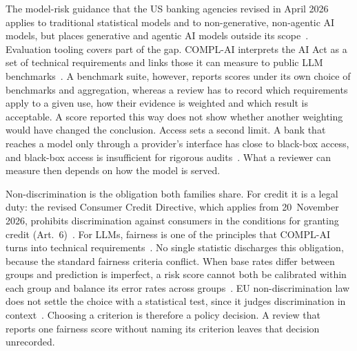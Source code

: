 The model-risk guidance that the US banking agencies revised in April 2026 applies to traditional statistical models and to non-generative, non-agentic AI models, but places generative and agentic AI models outside its scope~\cite{federalreserve2026sr262}.
Evaluation tooling covers part of the gap.
COMPL-AI interprets the AI Act as a set of technical requirements and links those it can measure to public LLM benchmarks~\cite{guldimann2024complai}.
A benchmark suite, however, reports scores under its own choice of benchmarks and aggregation, whereas a review has to record which requirements apply to a given use, how their evidence is weighted and which result is acceptable.
A score reported this way does not show whether another weighting would have changed the conclusion.
Access sets a second limit.
A bank that reaches a model only through a provider's interface has close to black-box access, and black-box access is insufficient for rigorous audits~\cite{casper2024blackbox}.
What a reviewer can measure then depends on how the model is served.

Non-discrimination is the obligation both families share.
For credit it is a legal duty: the revised Consumer Credit Directive, which applies from 20~November 2026, prohibits discrimination against consumers in the conditions for granting credit (Art.~6)~\cite{euccd2023}.
For LLMs, fairness is one of the principles that COMPL-AI turns into technical requirements~\cite{guldimann2024complai}.
No single statistic discharges this obligation, because the standard fairness criteria conflict.
When base rates differ between groups and prediction is imperfect, a risk score cannot both be calibrated within each group and balance its error rates across groups~\cite{kleinberg2017inherent,chouldechova2017fair}.
EU non-discrimination law does not settle the choice with a statistical test, since it judges discrimination in context~\cite{wachter2021fairness}.
Choosing a criterion is therefore a policy decision.
A review that reports one fairness score without naming its criterion leaves that decision unrecorded.

